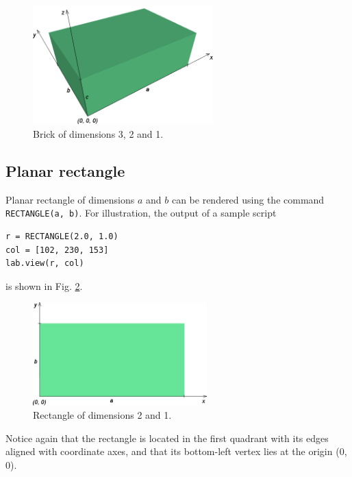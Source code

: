 \begin{figure}[!ht]
\begin{center}
\includegraphics[width=0.62\textwidth]{img/cuboid-1.png}
\end{center}
\vspace{-4mm}
\caption{Brick of dimensions 3, 2 and 1.}
\label{fig:cuboid-1}
\vspace{-1cm}
\end{figure}
\newpage
\noindent

\subsection{Planar rectangle}

\noindent
Planar rectangle of dimensions $a$ and $b$ can be rendered using the 
command {\tt RECTANGLE(a, b)}. For illustration, the output of a sample script\\

\begin{bbox}
\begin{verbatim}
r = RECTANGLE(2.0, 1.0)
col = [102, 230, 153]
lab.view(r, col)
\end{verbatim}
\end{bbox}
\vspace{6mm}

\noindent
is shown in Fig. \ref{fig:cuboid-2}.

\begin{figure}[!ht]
\begin{center}
\includegraphics[width=0.6\textwidth]{img/cuboid-2.png}
\end{center}
\vspace{-4mm}
\caption{Rectangle of dimensions 2 and 1.}
\label{fig:cuboid-2}
\end{figure}
\noindent
Notice again that the rectangle is located in the first quadrant with its edges 
aligned with coordinate axes, and that its bottom-left vertex lies at the 
origin (0, 0).


